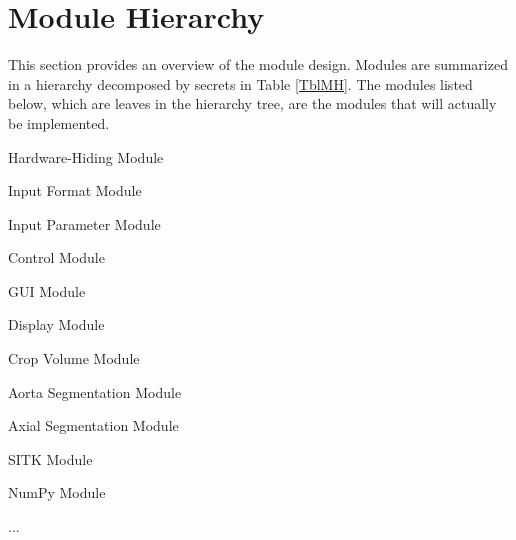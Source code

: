 \documentclass[12pt, titlepage]{article}
\newcounter{mnum}
\newcommand{\mthemnum}{M\themnum}
\begin{document}
\section{Module Hierarchy} \label{SecMH}

This section provides an overview of the module design. Modules are summarized
in a hierarchy decomposed by secrets in Table \ref{TblMH}. The modules listed
below, which are leaves in the hierarchy tree, are the modules that will
actually be implemented.

\begin{description}
\item [ \mthemnum \label{mHH}:] Hardware-Hiding Module
\item [ \mthemnum \label{mInput}:] Input Format Module
\item [ \mthemnum \label{mParams}:] Input Parameter Module
\item [ \mthemnum \label{mControl}:] Control Module
\item [ \mthemnum \label{mGUI}:] GUI Module
\item [ \mthemnum \label{mDisplay}:] Display Module
\item [ \mthemnum \label{mROI}:] Crop Volume Module
\item [ \mthemnum \label{mAortaSeg}:] Aorta Segmentation Module
\item [ \mthemnum \label{mAS}:] Axial Segmentation Module
\item [ \mthemnum \label{mSITK}:] SITK Module
\item [ \mthemnum \label{mNP}:] NumPy Module
\item ...
\end{description}
\end{document}
